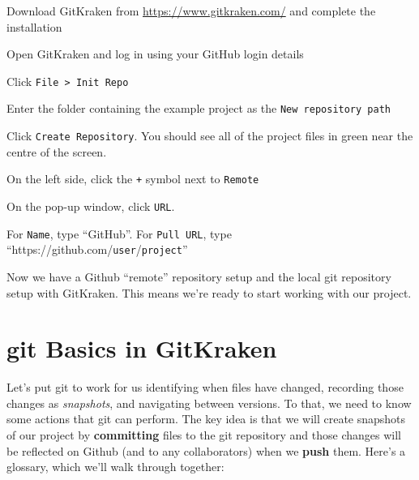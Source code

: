 \documentclass[12pt, a4paper]{article}
\begin{document}
\begin{enumerate*}
\item Download GitKraken from \url{https://www.gitkraken.com/} and complete the installation
\item Open GitKraken and log in using your GitHub login details
\item Click \texttt{File > Init Repo}
\item Enter the folder containing the example project as the \texttt{New repository path}
\item Click \texttt{Create Repository}. You should see all of the project files in green near the centre of the screen.
\item On the left side, click the \texttt{+} symbol next to \texttt{Remote}
\item On the pop-up window, click \texttt{URL}.
\item For \texttt{Name}, type ``GitHub''. For \texttt{Pull URL}, type ``https://github.com/\texttt{user}/\texttt{project}''
\end{enumerate*}

Now we have a Github ``remote'' repository setup and the local git repository setup with GitKraken. This means we're ready to start working with our project.

\clearpage

\section{git Basics in GitKraken}

Let's put git to work for us identifying when files have changed, recording those changes as \textit{snapshots}, and navigating between versions. To that, we need to know some actions that git can perform. The key idea is that we will create snapshots of our project by \textbf{committing} files to the git repository and those changes will be reflected on Github (and to any collaborators) when we \textbf{push} them. Here's a glossary, which we'll walk through together:
\end{document}
